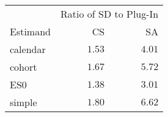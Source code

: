 \captionsetup[table]{labelformat=empty,skip=1pt}
\begin{longtable}{lrr}
\toprule
 & \multicolumn{2}{c}{Ratio of SD to Plug-In} \\ 
 \cmidrule(lr){2-3}
Estimand & CS & SA \\ 
\midrule
calendar & $1.53$ & $4.01$ \\ 
cohort & $1.67$ & $5.72$ \\ 
ES0 & $1.38$ & $3.01$ \\ 
simple & $1.80$ & $6.62$ \\ 
 \bottomrule
\end{longtable}

